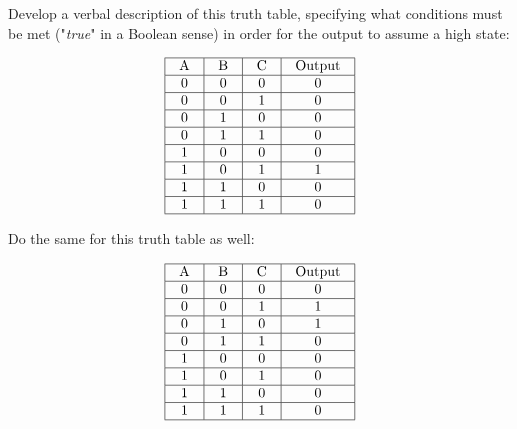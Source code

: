 

Develop a verbal description of this truth table, specifying what conditions must be met ("{\it true}" in a Boolean sense) in order for the output to assume a high state:



$$\vbox{\offinterlineskip
\halign{\strut
\vrule \quad\hfil # \ \hfil & 
\vrule \quad\hfil # \ \hfil & 
\vrule \quad\hfil # \ \hfil & 
\vrule \quad\hfil # \ \hfil \vrule \cr
\noalign{\hrule}
%
A & B & C & Output \cr
%
\noalign{\hrule}
%
0 & 0 & 0 & 0 \cr
%
\noalign{\hrule}
%
0 & 0 & 1 & 0 \cr
%
\noalign{\hrule}
%
0 & 1 & 0 & 0 \cr
%
\noalign{\hrule}
%
0 & 1 & 1 & 0 \cr
%
\noalign{\hrule}
%
1 & 0 & 0 & 0 \cr
%
\noalign{\hrule}
%
1 & 0 & 1 & 1 \cr
%
\noalign{\hrule}
%
1 & 1 & 0 & 0 \cr
%
\noalign{\hrule}
%
1 & 1 & 1 & 0 \cr
%
\noalign{\hrule}
} %
}$$ %

\vskip 10pt

Do the same for this truth table as well:



$$\vbox{\offinterlineskip
\halign{\strut
\vrule \quad\hfil # \ \hfil & 
\vrule \quad\hfil # \ \hfil & 
\vrule \quad\hfil # \ \hfil & 
\vrule \quad\hfil # \ \hfil \vrule \cr
\noalign{\hrule}
%
A & B & C & Output \cr
%
\noalign{\hrule}
%
0 & 0 & 0 & 0 \cr
%
\noalign{\hrule}
%
0 & 0 & 1 & 1 \cr
%
\noalign{\hrule}
%
0 & 1 & 0 & 1 \cr
%
\noalign{\hrule}
%
0 & 1 & 1 & 0 \cr
%
\noalign{\hrule}
%
1 & 0 & 0 & 0 \cr
%
\noalign{\hrule}
%
1 & 0 & 1 & 0 \cr
%
\noalign{\hrule}
%
1 & 1 & 0 & 0 \cr
%
\noalign{\hrule}
%
1 & 1 & 1 & 0 \cr
%
\noalign{\hrule}
} %
}$$ %

